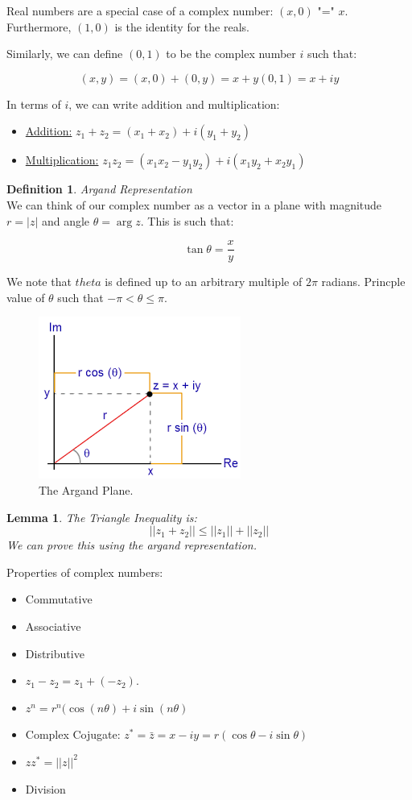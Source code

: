 \documentclass{article}
\newtheorem{lemma}{Lemma}
\theoremstyle{definition}
\newtheorem{definition}{Definition}[section]
\newcommand{\Def}[2]{
\begin{shaded*}
\begin{definition}{\textit{#1}}\\#2\end{definition}
\end{shaded*}
}
\newcommand{\norm}[1]{\left|\left|#1\right|\right|}
\begin{document}
Real numbers are a special case of a complex number: $(x, 0) $ "=" $x$. Furthermore, $(1,0)$ is the identity for the reals. 

Similarly, we can define $(0,1)$ to be the complex number $i$ such that:

$$(x,y) = (x, 0) + (0,y) = x + y(0,1) = x + iy$$

In terms of $i$, we can write addition and multiplication:

\begin{itemize}
	\item \underline{Addition:} $z_1 + z_2 = (x_1 + x_2) + i (y_1+y_2)$
	\item \underline{Multiplication:} $z_1 z_2 = (x_1 x_2 - y_1 y_2) + i (x_1 y_2 + x_2 y_1)$
\end{itemize}


\Def{Argand Representation}{We can think of our complex number as a vector in a plane with magnitude $r = |z|$ and angle $\theta = \arg z$. This is such that:

$$\tan \theta = \frac{x}{y}$$

We note that $theta$ is defined up to an arbitrary multiple of $2\pi$ radians. Princple value of $\theta$ such that $-\pi < \theta \leq \pi.$

\begin{figure}[H]
	\centering
	\includegraphics[width=0.5\linewidth]{Argand_plane}
	\caption{The Argand Plane.}
	\label{fig:argand}
\end{figure}
}

\begin{lemma}
	The Triangle Inequality is:
	$$\norm{z_1 + z_2} \leq \norm{z_1} + \norm{z_2}$$
	We can prove this using the argand representation. 
\end{lemma}

Properties of complex numbers:

\begin{itemize}
	\item Commutative
	\item Associative
	\item Distributive
	\item $z_1 -z_2 = z_1 + (-z_2)$.
	\item $z^n = r^n(\cos(n\theta) + i \sin(n\theta)$
	\item Complex Cojugate: $z^* = \bar{z} = x-iy = r(\cos\theta - i \sin\theta)$
	\item $z z^* = \norm{z}^2$
	\item Division 
\end{itemize}
\end{document}
